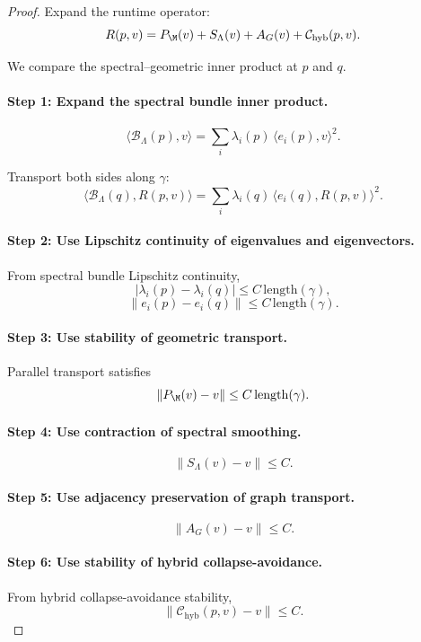 \begin{proof}
Expand the runtime operator:
\[
R(p,v)
=
P_\M(v)
+
S_\Lambda(v)
+
A_G(v)
+
\mathcal{C}_{\mathrm{hyb}}(p,v).
\]

We compare the spectral--geometric inner product at $p$ and $q$.

\paragraph{Step 1: Expand the spectral bundle inner product.}
\[
\langle \mathcal{B}_\Lambda(p), v \rangle
=
\sum_i \lambda_i(p)\,\langle e_i(p), v \rangle^2.
\]

Transport both sides along $\gamma$:
\[
\langle \mathcal{B}_\Lambda(q), R(p,v) \rangle
=
\sum_i \lambda_i(q)\,\langle e_i(q), R(p,v) \rangle^2.
\]

\paragraph{Step 2: Use Lipschitz continuity of eigenvalues and eigenvectors.}
From spectral bundle Lipschitz continuity,
\[
|\lambda_i(p) - \lambda_i(q)| \le C\,\mathrm{length}(\gamma),
\]
\[
\|e_i(p) - e_i(q)\| \le C\,\mathrm{length}(\gamma).
\]

\paragraph{Step 3: Use stability of geometric transport.}
Parallel transport satisfies
\[
\|P_\M(v) - v\| \le C\,\mathrm{length}(\gamma).
\]

\paragraph{Step 4: Use contraction of spectral smoothing.}
\[
\|S_\Lambda(v) - v\| \le C.
\]

\paragraph{Step 5: Use adjacency preservation of graph transport.}
\[
\|A_G(v) - v\| \le C.
\]

\paragraph{Step 6: Use stability of hybrid collapse-avoidance.}
From hybrid collapse-avoidance stability,
\[
\|\mathcal{C}_{\mathrm{hyb}}(p,v) - v\|
\le C.
\]


\end{proof}
